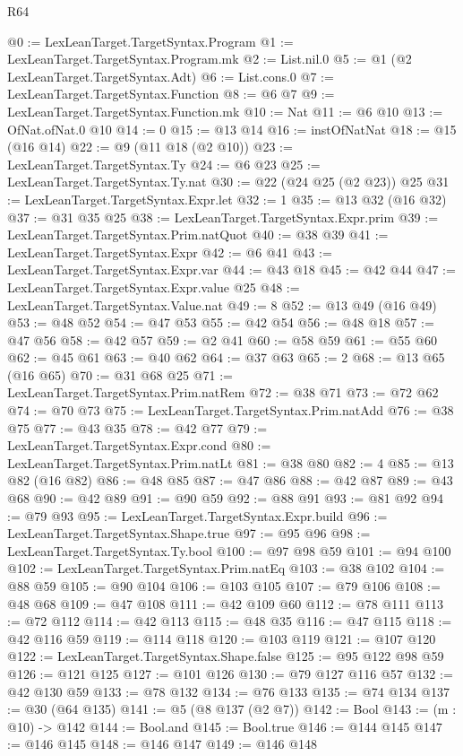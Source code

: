 \begin{lexlean}{R64}
\begin{coremodule}
@0 := LexLeanTarget.TargetSyntax.Program
@1 := LexLeanTarget.TargetSyntax.Program.mk
@2 := List.nil.{0}
@5 := @1 (@2 LexLeanTarget.TargetSyntax.Adt)
@6 := List.cons.{0}
@7 := LexLeanTarget.TargetSyntax.Function
@8 := @6 @7
@9 := LexLeanTarget.TargetSyntax.Function.mk
@10 := Nat
@11 := @6 @10
@13 := OfNat.ofNat.{0} @10
@14 := 0
@15 := @13 @14
@16 := instOfNatNat
@18 := @15 (@16 @14)
@22 := @9 (@11 @18 (@2 @10))
@23 := LexLeanTarget.TargetSyntax.Ty
@24 := @6 @23
@25 := LexLeanTarget.TargetSyntax.Ty.nat
@30 := @22 (@24 @25 (@2 @23)) @25
@31 := LexLeanTarget.TargetSyntax.Expr.let
@32 := 1
@35 := @13 @32 (@16 @32)
@37 := @31 @35 @25
@38 := LexLeanTarget.TargetSyntax.Expr.prim
@39 := LexLeanTarget.TargetSyntax.Prim.natQuot
@40 := @38 @39
@41 := LexLeanTarget.TargetSyntax.Expr
@42 := @6 @41
@43 := LexLeanTarget.TargetSyntax.Expr.var
@44 := @43 @18
@45 := @42 @44
@47 := LexLeanTarget.TargetSyntax.Expr.value @25
@48 := LexLeanTarget.TargetSyntax.Value.nat
@49 := 8
@52 := @13 @49 (@16 @49)
@53 := @48 @52
@54 := @47 @53
@55 := @42 @54
@56 := @48 @18
@57 := @47 @56
@58 := @42 @57
@59 := @2 @41
@60 := @58 @59
@61 := @55 @60
@62 := @45 @61
@63 := @40 @62
@64 := @37 @63
@65 := 2
@68 := @13 @65 (@16 @65)
@70 := @31 @68 @25
@71 := LexLeanTarget.TargetSyntax.Prim.natRem
@72 := @38 @71
@73 := @72 @62
@74 := @70 @73
@75 := LexLeanTarget.TargetSyntax.Prim.natAdd
@76 := @38 @75
@77 := @43 @35
@78 := @42 @77
@79 := LexLeanTarget.TargetSyntax.Expr.cond
@80 := LexLeanTarget.TargetSyntax.Prim.natLt
@81 := @38 @80
@82 := 4
@85 := @13 @82 (@16 @82)
@86 := @48 @85
@87 := @47 @86
@88 := @42 @87
@89 := @43 @68
@90 := @42 @89
@91 := @90 @59
@92 := @88 @91
@93 := @81 @92
@94 := @79 @93
@95 := LexLeanTarget.TargetSyntax.Expr.build
@96 := LexLeanTarget.TargetSyntax.Shape.true
@97 := @95 @96
@98 := LexLeanTarget.TargetSyntax.Ty.bool
@100 := @97 @98 @59
@101 := @94 @100
@102 := LexLeanTarget.TargetSyntax.Prim.natEq
@103 := @38 @102
@104 := @88 @59
@105 := @90 @104
@106 := @103 @105
@107 := @79 @106
@108 := @48 @68
@109 := @47 @108
@111 := @42 @109 @60
@112 := @78 @111
@113 := @72 @112
@114 := @42 @113
@115 := @48 @35
@116 := @47 @115
@118 := @42 @116 @59
@119 := @114 @118
@120 := @103 @119
@121 := @107 @120
@122 := LexLeanTarget.TargetSyntax.Shape.false
@125 := @95 @122 @98 @59
@126 := @121 @125
@127 := @101 @126
@130 := @79 @127 @116 @57
@132 := @42 @130 @59
@133 := @78 @132
@134 := @76 @133
@135 := @74 @134
@137 := @30 (@64 @135)
@141 := @5 (@8 @137 (@2 @7))
@142 := Bool
@143 := (m : @10) -> @142
@144 := Bool.and
@145 := Bool.true
@146 := @144 @145
@147 := @146 @145
@148 := @146 @147
@149 := @146 @148

\end{coremodule}
\end{lexlean}
